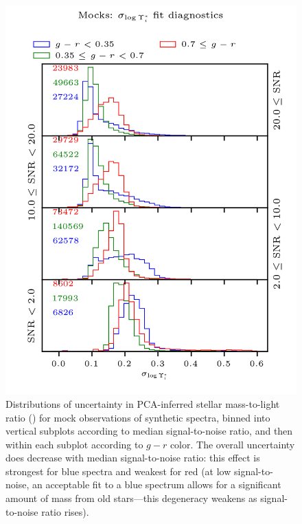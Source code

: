 \begin{figure}
    \centering
    \begin{minipage}[t]{\columnwidth}
        \centering
        \includegraphics[width=5in]{mocks_snr_color_hist_widMLi}
        \caption[ versus color and signal-to-noise in fits to mock data]{\fixspacing Distributions of uncertainty in PCA-inferred stellar mass-to-light ratio () for mock observations of synthetic spectra, binned into vertical subplots according to median signal-to-noise ratio, and then within each subplot according to $g-r$ color. The overall uncertainty does decrease with median signal-to-noise ratio: this effect is strongest for blue spectra and weakest for red (at low signal-to-noise, an acceptable fit to a blue spectrum allows for a significant amount of mass from old stars---this degeneracy weakens as signal-to-noise ratio rises).}
        \label{fig:mocks_snr_color_hist_widMLi}
    \end{minipage}
    \hfill
    \begin{minipage}[t]{\columnwidth}

\end{minipage}
\end{figure}
